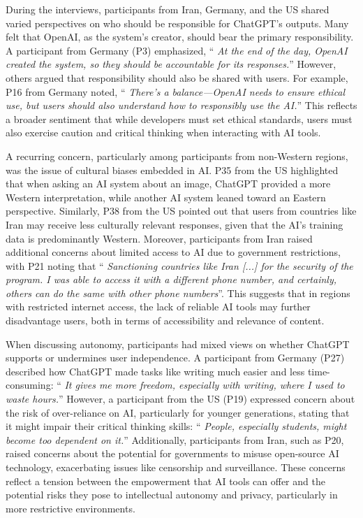 \documentclass[sigconf]{acmart}
\begin{document}
During the interviews, participants from Iran, Germany, and the US shared varied perspectives on who should be responsible for ChatGPT’s outputs. Many felt that OpenAI, as the system’s creator, should bear the primary responsibility. A participant from Germany (P3) emphasized, \enquote { \emph {At the end of the day, OpenAI created the system, so they should be accountable for its responses.}} However, others argued that responsibility should also be shared with users. For example, P16 from Germany noted, \enquote { \emph {There’s a balance—OpenAI needs to ensure ethical use, but users should also understand how to responsibly use the AI.}} This reflects a broader sentiment that while developers must set ethical standards, users must also exercise caution and critical thinking when interacting with AI tools.

A recurring concern, particularly among participants from non-Western regions, was the issue of cultural biases embedded in AI. P35 from the US highlighted that when asking an AI system about an image, ChatGPT provided a more Western interpretation, while another AI system leaned toward an Eastern perspective. Similarly, P38 from the US pointed out that users from countries like Iran may receive less culturally relevant responses, given that the AI’s training data is predominantly Western. Moreover, participants from Iran raised additional concerns about limited access to AI due to government restrictions, with P21 noting that \enquote { \emph {Sanctioning countries like Iran [...] for the security of the program. I was able to access it with a different phone number, and certainly, others can do the same with other phone numbers}}. This suggests that in regions with restricted internet access, the lack of reliable AI tools may further disadvantage users, both in terms of accessibility and relevance of content.

When discussing autonomy, participants had mixed views on whether ChatGPT supports or undermines user independence. A participant from Germany (P27) described how ChatGPT made tasks like writing much easier and less time-consuming: \enquote { \emph {It gives me more freedom, especially with writing, where I used to waste hours.}} However, a participant from the US (P19) expressed concern about the risk of over-reliance on AI, particularly for younger generations, stating that it might impair their critical thinking skills: \enquote { \emph {People, especially students, might become too dependent on it.}} Additionally, participants from Iran, such as P20, raised concerns about the potential for governments to misuse open-source AI technology, exacerbating issues like censorship and surveillance. These concerns reflect a tension between the empowerment that AI tools can offer and the potential risks they pose to intellectual autonomy and privacy, particularly in more restrictive environments.
\end{document}
